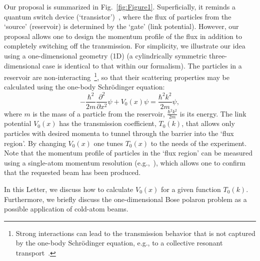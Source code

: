 \documentclass[twocolumn,amsmath,amssymb,showpacs,prl,superscriptaddress,aps]{revtex4-1}
\begin{document}
Our proposal is summarized in Fig.~\ref{fig:Figure1}.
Superficially, it reminds a quantum switch device
(`transistor')~\cite{zoller2004, marchukov2016}, where the flux of particles from the `source' (reservoir) 
is determined by the `gate' (link potential).
However, our proposal allows one to design the momentum profile 
of the flux in addition to completely switching off the transmission.
For simplicity, we illustrate our idea using a one-dimensional geometry (1D) 
(a cylindrically symmetric three-dimensional case is identical to that
within our formalism). The particles in a reservoir are non-interacting~\footnote{
Strong interactions can lead to the transmission behavior that is not captured by the one-body Schr{\"o}dinger equation, e.g.,
to a collective resonant transport~\cite{Schlagheck2005}.},
so that their scattering properties may be calculated using the one-body Schr{\"o}dinger equation:
\begin{equation}
-\frac{\hbar^2}{2m}\frac{\partial^2}{\partial x^2}\psi+V_0(x)\psi=\frac{\hbar^2k^2}{2m}\psi,
\label{eq:schr}
\end{equation}
where $m$ is the mass of a particle from the reservoir, $\frac{\hbar^2k^2}{2m}$ is its energy.
The link potential $V_0(x)$ has the transmission coefficient, $T_0(k)$, that allows only particles with desired momenta to 
tunnel through the barrier into the `flux region'. By changing $V_0(x)$ one tunes $T_0(x)$ to the needs of the experiment.
Note that the momentum profile of particles in the `flux region' can be measured using 
a single-atom momentum resolution (e.g.,~\cite{jochim2018}),
which allows one to confirm that the requested beam has been produced.


In this Letter,  we discuss how to 
calculate $V_0(x)$ for a given function $T_0(k)$. Furthermore, we briefly discuss the one-dimensional 
Bose polaron problem as a possible application of cold-atom beams. 
\end{document}
